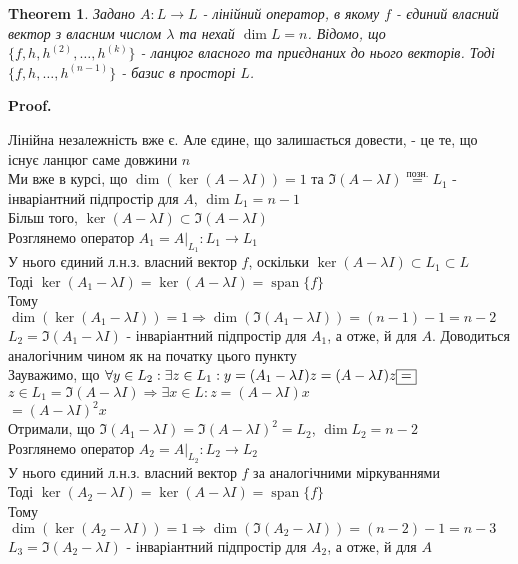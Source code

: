 \documentclass[a4paper, 10pt]{article}
\makeatletter
\theoremstyle{theoremdd}
\newtheorem{theorem}{Theorem}[subsection]
\DeclareMathOperator{\linspan}{span}
\renewenvironment{proof}[1][Proof.\\]{\par
\pushQED{\hfill \qed}%
\normalfont \topsep6\p@\@plus6\p@\relax
\trivlist
\item\relax
{\bfseries
#1\@addpunct{.}}\hspace\labelsep\ignorespaces
}{%
\popQED\endtrivlist\@endpefalse
}
\makeatother
\begin{document}
\begin{theorem}
Задано $A: L \to L$ - лінійний оператор, в якому $f$ - єдиний власний вектор з власним числом $\lambda$ та нехай $\dim L = n$. Відомо, що $\{f,h,h^{(2)},\dots,h^{(k)}\}$ - ланцюг власного та приєднаних до нього векторів.
Тоді $\{f,h,\dots,h^{(n-1)}\}$ - базис в просторі $L$.
\end{theorem}

\begin{proof}
Лінійна незалежність вже є. Але єдине, що залишається довести, - це те, що існує ланцюг саме довжини $n$\\
Ми вже в курсі, що $\dim(\ker(A-\lambda I)) = 1$ та $\Im(A-\lambda I) \overset{\textrm{позн.}}{=} L_1$ - інваріантний підпростір для $A$, $\dim L_1 = n-1$\\
Більш того, $\ker(A-\lambda I) \subset \Im(A-\lambda I)$
\bigskip \\
Розглянемо оператор $A_1 = A |_{L_1}: L_1 \to L_1$\\
У нього єдиний л.н.з. власний вектор $f$, оскільки $\ker(A-\lambda I) \subset L_1 \subset L$\\
Тоді $\ker(A_1-\lambda I) = \ker(A-\lambda I) = \linspan\{f\}$\\
Тому $\dim(\ker(A_1 - \lambda I)) = 1 \Rightarrow \dim (\Im(A_1-\lambda I)) = (n-1)-1=n-2$\\
$L_2 = \Im(A_1-\lambda I)$ - інваріантний підпростір для $A_1$, а отже, й для $A$. Доводиться аналогічним чином як на початку цього пункту\\
Зауважимо, що $\forall y \in L_2: \exists z \in L_1: \\ y = (A_1 - \lambda I)z = (A-\lambda I)z \boxed{=}$\\
$z \in L_1 = \Im(A-\lambda I) \Rightarrow \exists x \in L: z = (A-\lambda I)x$\\
$\boxed{=} (A-\lambda I)^2 x$\\
Отримали, що $\Im(A_1 - \lambda I) = \Im(A-\lambda I)^2 = L_2$, $\dim L_2 = n-2$
\bigskip \\
Розглянемо оператор $A_2 = A |_{L_2}: L_2 \to L_2$\\
У нього єдиний л.н.з. власний вектор $f$ за аналогічними міркуваннями\\
Тоді $\ker(A_2-\lambda I) = \ker(A-\lambda I) = \linspan\{f\}$\\
Тому $\dim(\ker(A_2 - \lambda I)) = 1 \Rightarrow \dim (\Im(A_2-\lambda I)) = (n-2)-1=n-3$\\
$L_3 = \Im(A_2-\lambda I)$ - інваріантний підпростір для $A_2$, а отже, й для $A$\\

\end{proof}
\end{document}

